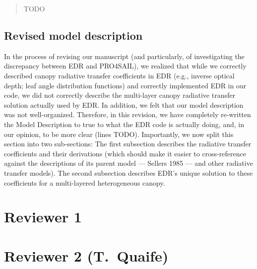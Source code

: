 \documentclass{article}
\begin{document}
\begin{quote}

  TODO

\end{quote}

\subsection{Revised model description}\label{subsec:model}

In the process of revising our manuscript (and particularly, of investigating the discrepancy between EDR and PRO4SAIL), we realized that while we correctly described canopy radiative transfer coefficients in EDR (e.g., inverse optical depth; leaf angle distribution functions) and correctly implemented EDR in our code,
we did not correctly describe the multi-layer canopy radiative transfer solution actually used by EDR.\@
In addition, we felt that our model description was not well-organized.
Therefore, in this revision, we have completely re-written the Model Description to true to what the EDR code is actually doing, and, in our opinion, to be more clear (lines TODO).
Importantly, we now split this section into two sub-sections:
The first subsection describes the radiative transfer coefficients and their derivations (which should make it easier to cross-reference against the descriptions of its parent model --- Sellers 1985 --- and other radiative transfer models).
The second subsection describes EDR's unique solution to these coefficients for a multi-layered heterogeneous canopy.

\section{Reviewer 1}\label{sec:r1}



\section{Reviewer 2 (T.\ Quaife)}\label{sec:r2}




\end{document}
